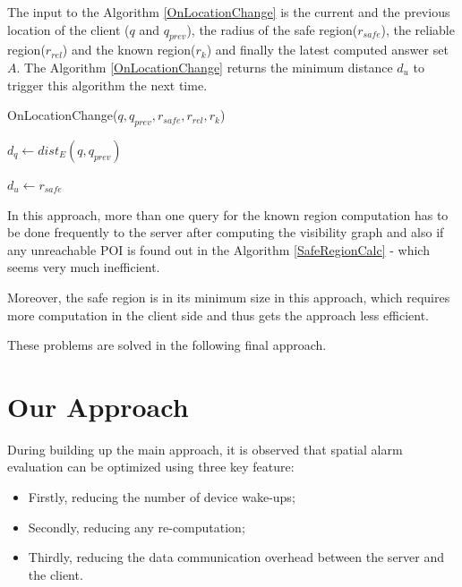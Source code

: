 \documentclass{sig-alternate}
\begin{document}
The input to the Algorithm \ref{OnLocationChange} is the current and the previous location of the client ($q$ and $q_{prev}$), the radius of the safe region($r_{safe}$), the reliable region($r_{rel}$) and the known region($r_{k}$) and finally the latest computed answer set $A$. The Algorithm \ref{OnLocationChange} returns the minimum distance $d_u$ to trigger this algorithm the next time.

\begin{algorithm}
\caption{OnLocationChange($q, q_{prev}, r_{safe}, r_{rel}, r_k$)}
\label{OnLocationChange}
    
    $d_q \gets dist_E(q, q_{prev})$
    
    
    \Return $d_u \gets r_{safe}$
\end{algorithm}

In this approach, more than one query for the known region computation has to be done frequently to the server after computing the visibility graph and also if any unreachable POI is found out in the Algorithm \ref{SafeRegionCalc} - which seems very much inefficient.

Moreover, the safe region is in its minimum size in this approach, which requires more computation in the client side and thus gets the approach less efficient.

These problems are solved in the following final approach.

\section{Our Approach}
During building up the main approach, it is observed that spatial alarm evaluation can be optimized using three key feature: 
\begin{itemize}
\setlength\itemsep{0em}
\item Firstly, reducing the number of device wake-ups;
\item Secondly, reducing any re-computation;
\item Thirdly, reducing the data communication overhead between the server and the client.
\end{itemize}
\end{document}
